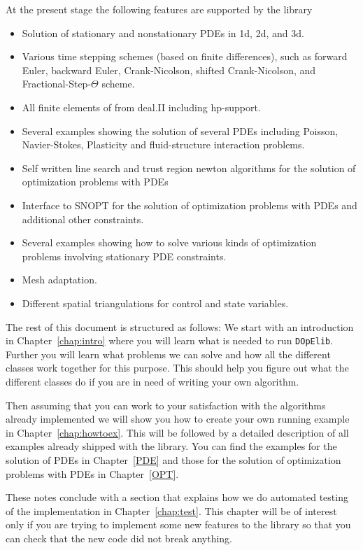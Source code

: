 At the present stage the following features are supported by the library
\begin{itemize}
\item Solution of stationary and nonstationary PDEs in 1d, 2d, and 3d.
\item Various time stepping schemes (based on finite differences), 
  such as forward Euler, backward Euler,
  Crank-Nicolson, shifted Crank-Nicolson, and Fractional-Step-$\Theta$ scheme.
\item All finite elements of from deal.II including hp-support.
\item Several examples showing the solution of several PDEs including
   Poisson, Navier-Stokes, Plasticity and fluid-structure interaction problems. 
\item Self written line search and trust region newton algorithms for the 
   solution of optimization problems with PDEs \cite{NoWr00}
\item Interface to SNOPT for the solution of optimization problems with PDEs and
  additional other constraints.
\item Several examples showing how to solve various kinds of optimization problems
  involving stationary PDE constraints.
\item Mesh adaptation.
\item Different spatial triangulations for control and state variables.
\end{itemize}
 
The rest of this document is structured as follows: We start with an introduction in
Chapter~\ref{chap:intro} where you will learn what is needed to run {\tt DOpElib}. 
Further you will learn what problems we can solve and how all the different classes 
work together for this purpose. This should help you figure out what the different classes
do if you are in need of writing your own algorithm.

Then assuming that you can work to your satisfaction with the algorithms already implemented
we will show you how to create your own running example in Chapter~\ref{chap:howtoex}.
This will be followed by a detailed description of all examples already shipped with 
the library. You can find the examples for the solution of PDEs in Chapter~\ref{PDE}
and those for the solution of optimization problems with PDEs in Chapter~\ref{OPT}.

These notes conclude with a section that explains how we do automated testing of the 
implementation in Chapter~\ref{chap:test}. This chapter will be of interest only if you 
are trying to implement some new features to the library so that you can check that 
the new code did not break anything.

